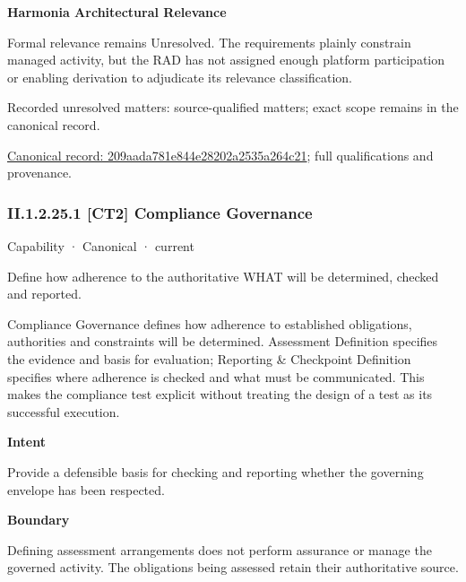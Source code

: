 \textbf{Harmonia Architectural Relevance}



Formal relevance remains Unresolved. The requirements plainly constrain managed activity, but the RAD has not assigned enough platform participation or enabling derivation to adjudicate its relevance classification.


{\small Recorded unresolved matters: source-qualified matters; exact scope remains in the canonical record.}\par
{\footnotesize \href{../../../../continuum/strategy/capability/209aada781e844e28202a2535a264c21.md}{Canonical record: 209aada781e844e28202a2535a264c21}; full qualifications and provenance.}\par
\subsubsection*{II.1.2.25.1 [CT2] Compliance Governance}
\label{navigation:II.1.2.25.1}

\label{element:02a52157967f4b498807cac70e3410e9}
{\small Capability · Canonical · current}\par

Define how adherence to the authoritative WHAT will be determined, checked and reported.



Compliance Governance defines how adherence to established obligations, authorities and constraints will be determined. Assessment Definition specifies the evidence and basis for evaluation; Reporting \& Checkpoint Definition specifies where adherence is checked and what must be communicated. This makes the compliance test explicit without treating the design of a test as its successful execution.



\textbf{Intent}



Provide a defensible basis for checking and reporting whether the governing envelope has been respected.



\textbf{Boundary}



Defining assessment arrangements does not perform assurance or manage the governed activity. The obligations being assessed retain their authoritative source.


